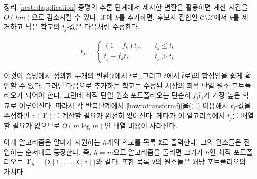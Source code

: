 \documentclass[11pt]{article} %
\newif\ifen
\theoremstyle{definition}
\theoremstyle{definition}
\begin{document}
\ifen 
We reduce the computation time to $O(hm)$ by taking advantage of the transformation from the inductive step in the proof of Theorem \ref{nestedapplication}. Once school $k$ is added to $\mathcal{X}$, we remove it from the set $\mathcal{C}\setminus \mathcal{X}$ of candidates, and update the $t_j$-values of the remaining schools according to the following transformation:
\else
정리 \ref{nestedapplication} 증명의 추론 단계에서 제시한 변환을 활용하면 계산 시간을 $O(hm)$으로 감소시킬 수 있다. $\mathcal{X}$에 $k$를 추가하면, 후보자 집합인 $\mathcal{C}\setminus \mathcal{X}$에서 $k$를 제거하고 남은 학교의 $t_j$-값은 다음처럼 수정한다.
\fi
\begin{align}\label{howtotransformfj}
\bar t_j = 
\begin{cases}
(1 - f_k) t_j, \quad & t_j \leq t_k \\
t_j - f_k t_k, \quad& t_j > t_k
\end{cases}
\end{align}
\ifen
It is easy to verify that this is the composition of the two transformations (from $t$ to $\tilde t$, and from $\tilde t$ to $\bar t$) given in the proof. Now, the \emph{next} school added must be the optimal singleton portfolio in the modified market. But the optimal singleton portfolio consists simply of the school with the highest value of $f_j \bar t_j$. Therefore, by updating the $t_j$-values at each iteration according to \eqref{howtotransformfj}, we eliminate the need to compute $v(\mathcal{X})$ entirely. Moreover, this algorithm does not require the schools to be indexed in ascending order by $t_j$, which removes the $O(m\log m)$ sorting cost.
\else
이것이 증명에서 정의한 두개의 변환($t$에서 $\tilde t$로, 그리고 $\tilde t$에서 $\bar t$로)의 합성임을 쉽게 확인할 수 있다. 그러면 다음으로 추가하는 학교는 수정된 시장의 최적 단일 원소 포트폴리오가 되어야 한다. 그런데 최적 단일 원소 포트폴리오는 단순히 $f_j \bar t_j$가 가장 높은 학교로 이루어진다. 따라서 각 반복단계에서 \eqref{howtotransformfj}을(를) 이용해서 $t_j$-값을 수정하면 $v(\mathcal{X})$를 계산할 필요가 완전히 없어진다. 게다가 이 알고리즘에서 $t_j$를 배열할 필요가 없으므로 $O(m\log m)$인 배열 비용이 사라진다.
\fi

 \ifen 
The algorithm below outputs a list $\mathtt{X}$ of the $h$ schools to which Alma should apply. The schools appear in the order of entry such that when the algorithm is run with $h=m$, the optimal portfolio of size $h$ is given by $\mathcal{X}_h = \{\mathtt{X[1]}, \dots, \mathtt{X[h]}\}$. The entries of the list $\mathtt{V}$ give the valuation thereof. 
\else
아래 알고리즘은 알마가 지원하는 $h$개의 학교를 목록 $\mathtt{X}$로 출력한다. 그의 원소들은 진입하는 순서대로 등장한다. 즉, $h=m$으로 알고리즘을 돌리면 크기가 $h$인 최적 포트폴리오는 $\mathcal{X}_h = \{\mathtt{X[1]}, \dots, \mathtt{X[h]}\}$와 같다. 또한 목록 $\mathtt{V}$의 원소들은 해당 포트폴리오의 가치다.
\fi
\end{document}
